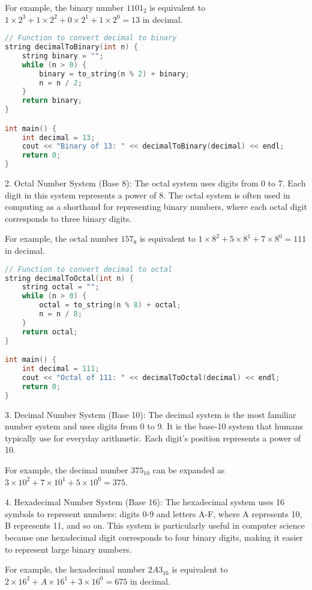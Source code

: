 \documentclass[10pt,a4paper]{article}
\begin{document}
   For example, the binary number \(1101_2\) is equivalent to \(1 \times 2^3 + 1 \times 2^2 + 0 \times 2^1 + 1 \times 2^0 = 13\) in decimal.

\begin{lstlisting}[language=C++]
// Function to convert decimal to binary
string decimalToBinary(int n) {
    string binary = "";
    while (n > 0) {
        binary = to_string(n % 2) + binary;
        n = n / 2;
    }
    return binary;
}

int main() {
    int decimal = 13;
    cout << "Binary of 13: " << decimalToBinary(decimal) << endl;
    return 0;
}
\end{lstlisting}

2. Octal Number System (Base 8):
   The octal system uses digits from 0 to 7. Each digit in this system represents a power of 8. The octal system is often used in computing as a shorthand for representing binary numbers, where each octal digit corresponds to three binary digits.

   For example, the octal number \(157_8\) is equivalent to \(1 \times 8^2 + 5 \times 8^1 + 7 \times 8^0 = 111\) in decimal.

\begin{lstlisting}[language=C++]
// Function to convert decimal to octal
string decimalToOctal(int n) {
    string octal = "";
    while (n > 0) {
        octal = to_string(n % 8) + octal;
        n = n / 8;
    }
    return octal;
}

int main() {
    int decimal = 111;
    cout << "Octal of 111: " << decimalToOctal(decimal) << endl;
    return 0;
}
\end{lstlisting}

3. Decimal Number System (Base 10):
   The decimal system is the most familiar number system and uses digits from 0 to 9. It is the base-10 system that humans typically use for everyday arithmetic. Each digit's position represents a power of 10.

   For example, the decimal number \(375_{10}\) can be expanded as \(3 \times 10^2 + 7 \times 10^1 + 5 \times 10^0 = 375\).

4. Hexadecimal Number System (Base 16):
   The hexadecimal system uses 16 symbols to represent numbers: digits 0-9 and letters A-F, where A represents 10, B represents 11, and so on. This system is particularly useful in computer science because one hexadecimal digit corresponds to four binary digits, making it easier to represent large binary numbers.

   For example, the hexadecimal number \(2A3_{16}\) is equivalent to \(2 \times 16^2 + A \times 16^1 + 3 \times 16^0 = 675\) in decimal.
\end{document}
